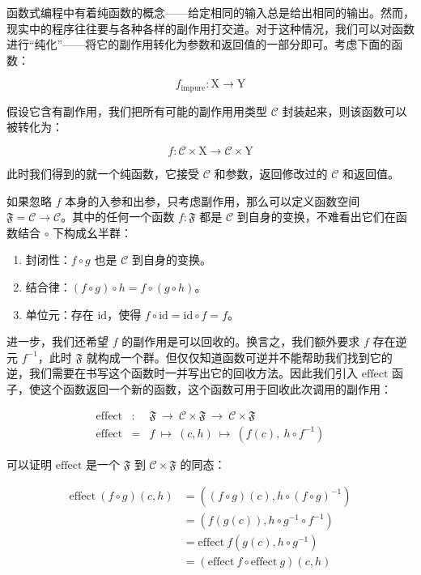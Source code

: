 \documentclass[
  chinese,
  11pt,
]{article}
\providecommand{\tightlist}{%
  \setlength{\itemsep}{0pt}\setlength{\parskip}{0pt}}
\begin{document}
函数式编程中有着纯函数的概念------给定相同的输入总是给出相同的输出。然而，现实中的程序往往要与各种各样的副作用打交道。对于这种情况，我们可以对函数进行``纯化''------将它的副作用转化为参数和返回值的一部分即可。考虑下面的函数：

\[
f_\text{impure}: \text{X}\to\text{Y}
\]

假设它含有副作用，我们把所有可能的副作用用类型 \(\mathcal{C}\)
封装起来，则该函数可以被转化为：

\[
f: \mathcal{C}\times\text{X}\to\mathcal{C}\times\text{Y}
\]

此时我们得到的就一个纯函数，它接受 \(\mathcal{C}\) 和参数，返回修改过的
\(\mathcal{C}\) 和返回值。

如果忽略 \(f\) 本身的入参和出参，只考虑副作用，那么可以定义函数空间
\(\mathfrak{F}=\mathcal{C}\to\mathcal{C}\)。其中的任何一个函数
\(f: \mathfrak{F}\) 都是 \(\mathcal{C}\)
到自身的变换，不难看出它们在函数结合 \(\circ\) 下构成幺半群：

\begin{enumerate}
\def\labelenumi{\arabic{enumi}.}
\tightlist
\item
  封闭性：\(f\circ g\) 也是 \(\mathcal{C}\) 到自身的变换。
\item
  结合律：\((f\circ g)\circ h=f\circ (g\circ h)\)。
\item
  单位元：存在 \(\text{id}\)，使得
  \(f\circ\text{id}=\text{id}\circ f=f\)。
\end{enumerate}

进一步，我们还希望 \(f\) 的副作用是可以回收的。换言之，我们额外要求
\(f\) 存在逆元 \(f^{-1}\)，此时 \(\mathfrak{F}\)
就构成一个群。但仅仅知道函数可逆并不能帮助我们找到它的逆，我们需要在书写这个函数时一并写出它的回收方法。因此我们引入
\(\text{effect}\)
函子，使这个函数返回一个新的函数，这个函数可用于回收此次调用的副作用：

\[
\begin{array}{rcl}
\text{effect}&:&\mathfrak{F}\ \to\ \mathcal{C}\times\mathfrak{F}\ \to\ \mathcal{C}\times\mathfrak{F}\\
\text{effect}&=&f\ \mapsto\ \left(c,h\right)\ \mapsto\ \left(f(c),\ h\circ f^{-1}\right)
\end{array}
\]

可以证明 \(\text{effect}\) 是一个 \(\mathfrak{F}\) 到
\(\mathcal{C}\times\mathfrak{F}\) 的同态：

\[
\begin{aligned}
\text{effect}\ (f\circ g) \left(c, h\right)
&=\left((f\circ g)(c), h\circ (f\circ g)^{-1}\right)\\
&=\left(f(g(c)), h\circ g^{-1}\circ f^{-1}\right)\\
&=\text{effect}\ f \left(g(c), h\circ g^{-1}\right)\\
&=\left(\text{effect}\ f\circ\text{effect}\ g\right) \left(c, h\right)
\end{aligned}
\]
\end{document}
